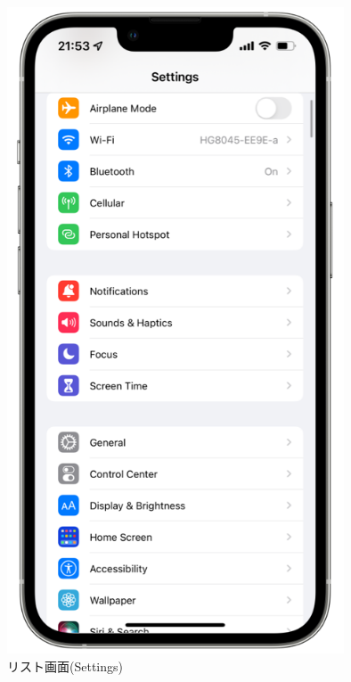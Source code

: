 \begin{figure}[htbp]
  \begin{minipage}{\hsize}
    \begin{center}
       \includegraphics[width=100mm]{img/Settings_screenshot.png}
    \end{center}
    \caption{リスト画面(Settings)}
    \label{fig:Settings_screenshot}
  \end{minipage}
\end{figure}

